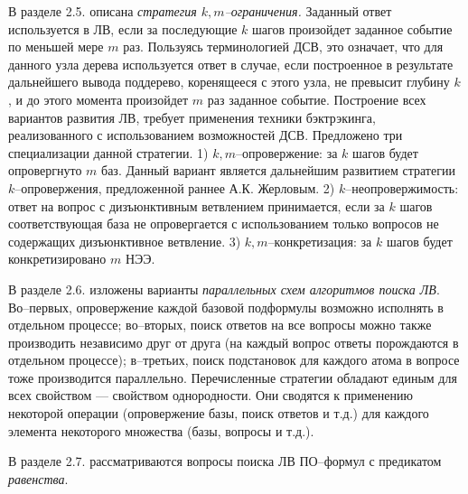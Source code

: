 \documentclass[a4paper]{report}
\begin{document}
В разделе 2.5. описана \emph{стратегия $k,m$--ограничения.} Заданный ответ используется в ЛВ, если за последующие $k$ шагов произойдет заданное событие по меньшей мере $m$ раз. Пользуясь терминологией ДСВ, это означает, что для данного узла дерева используется ответ в случае, если построенное в результате дальнейшего вывода поддерево, коренящееся с этого узла, не превысит глубину $k$, и до этого момента произойдет $m$ раз заданное событие. Построение всех вариантов развития ЛВ, требует применения техники бэктрэкинга, реализованного с использованием возможностей ДСВ. Предложено три специализации данной стратегии. 1)  $k,m$--опровержение: за $k$ шагов будет опровергнуто $m$ баз. Данный вариант является дальнейшим развитием стратегии $k$--опровержения, предложенной раннее А.К. Жерловым. 2) $k$--неопровержимость: ответ на вопрос с дизъюнктивным ветвлением принимается, если за $k$ шагов соответствующая база не опровергается с использованием только вопросов не содержащих дизъюнктивное ветвление.  3) $k,m$--конкретизация: за $k$ шагов будет конкретизировано $m$ НЭЭ.

В разделе 2.6. изложены варианты \emph{параллельных схем алгоритмов поиска ЛВ}. Во--первых, опровержение каждой базовой подформулы возможно исполнять в отдельном процессе; во--вторых, поиск ответов на все вопросы можно также производить независимо друг от друга (на каждый вопрос ответы порождаются в отдельном процессе); в--третьих, поиск подстановок для каждого атома в вопросе тоже производится параллельно. Перечисленные стратегии обладают единым для всех свойством --- свойством однородности. Они сводятся к применению некоторой операции (опровержение базы, поиск ответов и т.д.) для каждого элемента некоторого множества (базы, вопросы и т.д.).

В разделе 2.7. рассматриваются вопросы поиска ЛВ ПО--формул с предикатом \emph{равенства}. %
\end{document}
